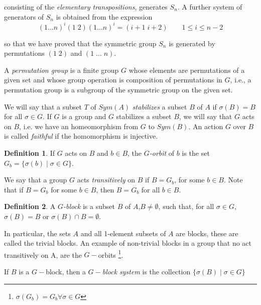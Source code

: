 \documentclass[12pt,a4paper]{book}
\theoremstyle{plain}
\theoremstyle{definition}
\newtheorem{definition}{Definition}
\theoremstyle{remark}
\begin{document}
consisting of the \emph{elementary transpositions}, generates $S_n$. A further system of generators of $S_n$ is obtained from the expression
\[
 ( 1 \ldots n)^i ( 1 \; 2 ) ( 1 \ldots n)^i = ( i+1 \; i+2) \qquad 1 \leq i \leq n-2
\]

so that we have proved that the symmetric group $S_n$ is generated by  permutations $(1\; 2)$ and $(1 \;\ldots \; n ) $.

 A \emph{permutation group} is a finite group $G$ whose elements are permutations of a given set and whose group operation is composition of permutations in $G$, i.e., a permutation group is a subgroup of the symmetric group on the given set.

We will say that a subset $T$ of $Sym(A)$ \emph{stabilizes} a subset $B$ of $A$ if $\sigma(B) = B$ for all $\sigma \in G$. If $G$ is a group and
$G$ stabilizes a subset $B$, we will say that $G$ acts on $B$, i.e. we have an homeomorphism from $G$ to $Sym(B)$. An action $G$ over $B$ 
is called \emph{faithful} if the homomorphism is injective.




\begin{definition}
If $G$ acts on $B$ and $b \in B$, the \emph{$G$-orbit} of $b$ is the set $G_b =\{ \sigma(b) \; | \; \sigma \in G \}$.
\end{definition}

We say that a group $G$ acts \emph{transitively} on $B$ if $B =G_b$, for some $b \in B$. Note that if $B=G_b$ for some $b \in B$, then $B= G_b$ for all 
$b \in B$.








\begin{definition}
A \emph{$G$-block} is a subset $B$ of $A$,$B \neq \emptyset$, such that, for all  $\sigma \in G$, $\sigma(B) = B $ or $\sigma(B) 
 \cap B = \emptyset$.

\end{definition}

 In particular, the sets $A$ and all 1-element subsets of $A$ are blocks, these are called the trivial blocks. An example of  non-trivial blocks in 
a group that no act transitively on A, are the $G-$orbits \footnote{$\sigma(G_b) = G_b \forall \sigma \in G$}.



If $B$ is a $G-$block, then a \emph{$G-$block system} is the collection $\{ \sigma(B) \; | \; \sigma \in G \}$
\end{document}

